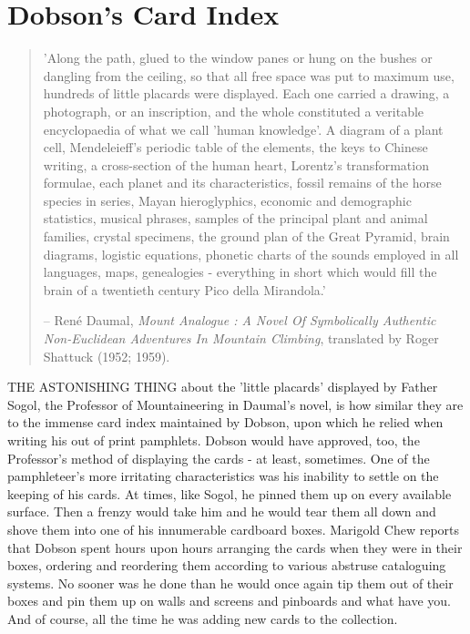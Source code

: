\chapter{Dobson's Card Index}

\begin{quotation}
'Along the path, glued to the window panes or hung on the bushes or dangling from the ceiling, so that all free space was put to maximum use, hundreds of little placards were displayed. Each one carried a drawing, a photograph, or an inscription, and the whole constituted a veritable encyclopaedia of what we call 'human knowledge'. A diagram of a plant cell, Mendeleieff's periodic table of the elements, the keys to Chinese writing, a cross-section of the human heart, Lorentz's transformation formulae, each planet and its characteristics, fossil remains of the horse species in series, Mayan hieroglyphics, economic and demographic statistics, musical phrases, samples of the principal plant and animal families, crystal specimens, the ground plan of the Great Pyramid, brain diagrams, logistic equations, phonetic charts of the sounds employed in all languages, maps, genealogies - everything in short which would fill the brain of a twentieth century Pico della Mirandola.' 

-- Ren\'{e} Daumal, \emph{Mount Analogue : A Novel Of Symbolically Authentic Non-Euclidean Adventures In Mountain Climbing}, translated by Roger Shattuck (1952; 1959).
\end{quotation}

THE ASTONISHING THING about the 'little placards' displayed by Father Sogol, the Professor of Mountaineering in Daumal's novel, is how similar they are to the immense card index maintained by Dobson, upon which he relied when writing his out of print pamphlets. Dobson would have approved, too, the Professor's method of displaying the cards - at least, sometimes. One of the pamphleteer's more irritating characteristics was his inability to settle on the keeping of his cards. At times, like Sogol, he pinned them up on every available surface. Then a frenzy would take him and he would tear them all down and shove them into one of his innumerable cardboard boxes. Marigold Chew reports that Dobson spent hours upon hours arranging the cards when they were in their boxes, ordering and reordering them according to various abstruse cataloguing systems. No sooner was he done than he would once again tip them out of their boxes and pin them up on walls and screens and pinboards and what have you. And of course, all the time he was adding new cards to the collection.

